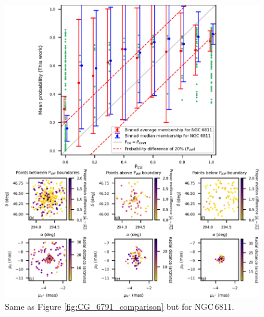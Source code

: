 \begin{figure}[hbtp]
    \centering
    \includegraphics[width=\linewidth]{Chapter4/NGC6811_CG_comparison.png}
    \caption[Comparison of membership probabilities for NGC\,6811]{Same as Figure \ref{fig:CG_6791_comparison} but for NGC\,6811.}
    \label{fig:CG_6811_comparison}
\end{figure}

